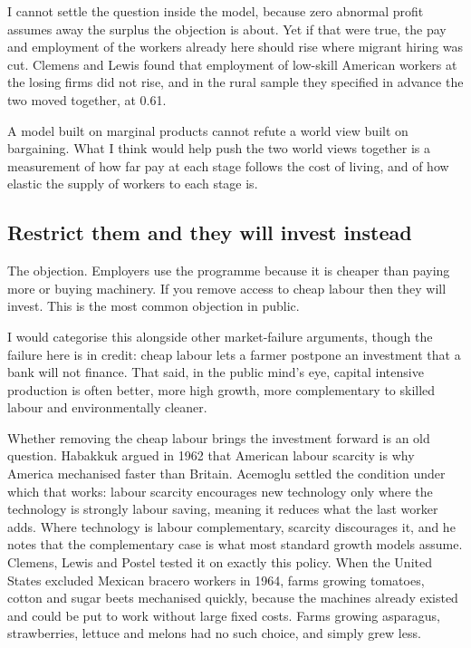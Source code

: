 \documentclass[11pt,a4paper]{article}
\begin{document}
I cannot settle the question inside the model, because zero abnormal profit assumes away the surplus the objection is about. Yet if that were true, the pay and employment of the workers already here should rise where migrant hiring was cut. Clemens and Lewis found that employment of low-skill American workers at the losing firms did not rise, and in the rural sample they specified in advance the two moved together, at 0.61.

A model built on marginal products cannot refute a world view built on bargaining. What I think would help push the two world views together is a measurement of how far pay at each stage follows the cost of living, and of how elastic the supply of workers to each stage is.

\subsection{Restrict them and they will invest instead}

The objection. Employers use the programme because it is cheaper than paying more or buying machinery. If you remove access to cheap labour then they will invest. This is the most common objection in public.

I would categorise this alongside other market-failure arguments, though the failure here is in credit: cheap labour lets a farmer postpone an investment that a bank will not finance. That said, in the public mind's eye, capital intensive production is often better, more high growth, more complementary to skilled labour and environmentally cleaner.

Whether removing the cheap labour brings the investment forward is an old question. Habakkuk argued in 1962 that American labour scarcity is why America mechanised faster than Britain. Acemoglu settled the condition under which that works: labour scarcity encourages new technology only where the technology is strongly labour saving, meaning it reduces what the last worker adds. Where technology is labour complementary, scarcity discourages it, and he notes that the complementary case is what most standard growth models assume. Clemens, Lewis and Postel tested it on exactly this policy. When the United States excluded Mexican bracero workers in 1964, farms growing tomatoes, cotton and sugar beets mechanised quickly, because the machines already existed and could be put to work without large fixed costs. Farms growing asparagus, strawberries, lettuce and melons had no such choice, and simply grew less.
\end{document}
